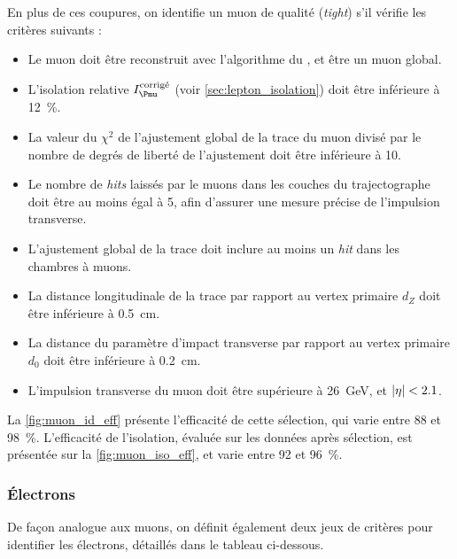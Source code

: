 En plus de ces coupures, on identifie un muon de qualité (\emph{tight}) s'il vérifie les critères suivants :
\begin{itemize}
  \item Le muon doit être reconstruit avec l'algorithme du \pf, et être un muon global.
  \item L'isolation relative $I_{\Pmu}^\text{corrigé}$ (voir \cref{sec:lepton_isolation}) doit être inférieure à \SI{12}{\%}.
  \item La valeur du $\chi^2$ de l'ajustement global de la trace du muon divisé par le nombre de degrés de liberté de l'ajustement doit être inférieure à \num{10}.
  \item Le nombre de \emph{hits} laissés par le muons dans les couches du trajectographe doit être au moins égal à 5, afin d'assurer une mesure précise de l'impulsion transverse.
  \item L'ajustement global de la trace doit inclure au moins un \emph{hit} dans les chambres à muons.
  \item La distance longitudinale de la trace par rapport au vertex primaire $d_Z$ doit être inférieure à \SI{0.5}{\cm}.
  \item La distance du paramètre d'impact transverse par rapport au vertex primaire $d_0$ doit être inférieure à \SI{0.2}{\cm}.
  \item L'impulsion transverse du muon doit être supérieure à \SI{26}{\GeV}, et $\lvert \eta \rvert < \num{2.1}$.
\end{itemize}

La \cref{fig:muon_id_eff} présente l'efficacité de cette sélection, qui varie entre \num{88} et \SI{98}{\%}. L'efficacité de l'isolation, évaluée sur les données après sélection, est présentée sur la \cref{fig:muon_iso_eff}, et varie entre \num{92} et \SI{96}{\%}.

\subsubsection{Électrons} \label{sec:sel_electron}

De façon analogue aux muons, on définit également deux jeux de critères pour identifier les électrons, détaillés dans le tableau ci-dessous.

